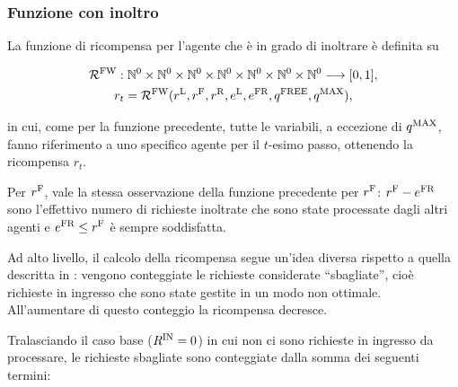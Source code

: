 \subsubsection{Funzione con inoltro}

La funzione di ricompensa per l'agente che è in grado di inoltrare è definita su

\begin{equation}
    \begin{gathered}
        \mathcal{R}^\textnormal{FW}: \mathbb{N}^0 \times \mathbb{N}^0 \times \mathbb{N}^0 \times \mathbb{N}^0 \times \mathbb{N}^0 \times \mathbb{N}^0 \times \mathbb{N}^0 \longrightarrow [0, 1], \\ r_t = \mathcal{R}^\textnormal{FW}(r^\textnormal{L}, r^\textnormal{F}, r^\textnormal{R}, e^\textnormal{L}, e^\textnormal{FR}, q^\textnormal{FREE}, q^\textnormal{MAX}),
    \end{gathered}
\end{equation}

in cui, come per la funzione precedente, tutte le variabili, a eccezione di $q^\textnormal{MAX}$, fanno riferimento a uno specifico agente per il $t$-esimo passo, ottenendo la ricompensa $r_t$.

Per $r^\textnormal{F}$, vale la stessa osservazione della funzione precedente per $r^\textnormal{F}$: $r^\textnormal{F} - e^\textnormal{FR}$ sono l'effettivo numero di richieste inoltrate che sono state processate dagli altri agenti e $e^\textnormal{FR} \le r^\textnormal{F}$ è sempre soddisfatta.

Ad alto livello, il calcolo della ricompensa segue un'idea diversa rispetto a quella descritta in : vengono conteggiate le richieste considerate ``sbagliate'', cioè richieste in ingresso che sono state gestite in un modo non ottimale. All'aumentare di questo conteggio la ricompensa decresce.

Tralasciando il caso base ($R^\textnormal{IN} = 0$) in cui non ci sono richieste in ingresso da processare, le richieste sbagliate sono conteggiate dalla somma dei seguenti termini:

